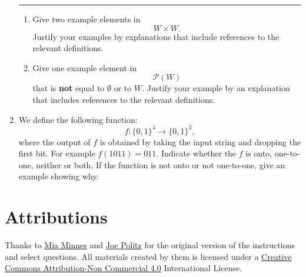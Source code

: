 \documentclass[12pt, oneside]{article}
\begin{document}
\begin{enumerate}
\rule{0.5\textwidth}{.4pt}


\begin{enumerate}
\item Give two example elements in 
\[
W \times W.
\]
Justify your examples by explanations that include references to the relevant definitions.

\item Give one example element in 
\[
\mathcal{P}(W)
\]
that is {\bf not} equal to $\emptyset$ or to $W$. Justify your example by an explanation that includes references to the relevant definitions.
\end{enumerate}

\item We define the following function: $$f: \{0,1\}^4 \rightarrow \{0,1\}^3,$$ where the output of $f$ is obtained by taking the input string and dropping the first bit. For example $f(1011) = 011$. Indicate whether the $f$ is onto, one-to-one, neither or both. If the function is not onto or not one-to-one, give an example showing why.

\end{enumerate}


\section*{Attributions}

Thanks to \href{http://cseweb.ucsd.edu/~minnes/}{Mia Minnes} and \href{https://jpolitz.github.io/}{Joe Politz} for the original version of the instructions and select questions. All materials created by them is licensed under a \href{http://creativecommons.org/licenses/by-nc/4.0/}{Creative Commons Attribution-Non Commercial 4.0} International License.
\end{document}

